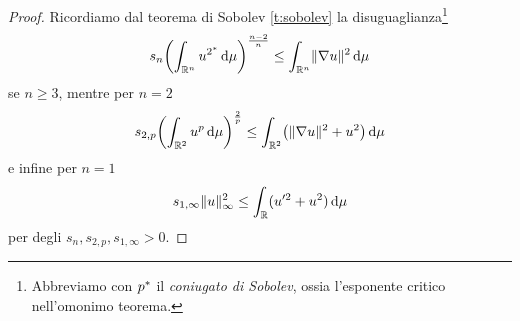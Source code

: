 \begin{proof}
    Ricordiamo dal teorema di Sobolev \ref{t:sobolev} la disuguaglianza\footnote{
        Abbreviamo con ${p}^*$ il \emph{coniugato di Sobolev}, ossia l'esponente critico nell'omonimo teorema.
    }
    \begin{equation}
        s_n\biggl(\int_{\mathbb{R}^n}u^{{{2}^*}}\,\textup{d}\mu\biggr)^\frac{n-2}{n} \le \int_{\mathbb{R}^n}\lVert\nabla u\rVert^2\,\textup{d}\mu
    \end{equation}
    se $n\ge 3$, mentre per $n=2$
    \begin{equation}
        s_{2,p}\biggl(\int_{\mathbb{R}^2}u^p\,\textup{d}\mu\biggr)^\frac2{p} \le \int_{\mathbb{R}^2}\bigl(\lVert\nabla u\rVert^2+u^2\bigr)\,\textup{d}\mu
    \end{equation}
    e infine per $n=1$
    \begin{equation}
        s_{1,\infty}\lVert u\rVert_\infty^2 \le \int_{\mathbb{R}}(u^{\prime 2}+u^2)\,\textup{d}\mu
    \end{equation}
    per degli $s_n,s_{2,p},s_{1,\infty}>0$.


\end{proof}
